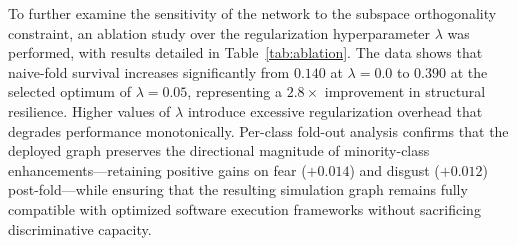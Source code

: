 \documentclass[algorithms,article,submit,moreauthors]{Definitions/mdpi}
\newcommand{\rev}[1]{\textcolor{revcolor}{#1}}
\begin{document}
\begin{table}[h!]
\centering
\caption{Recognition accuracy and macro-$F_1$ across graph variants on RAF-DB and FER2013 datasets.}
\label{tab:accuracy}
\end{table}



To further examine the sensitivity of the network to the subspace orthogonality constraint, an ablation study over the regularization hyperparameter $\lambda$ was performed, with results detailed in Table~\ref{tab:ablation}. The data shows that naive-fold survival increases significantly from $0.140$ at $\lambda = 0.0$ to $0.390$ at the selected optimum of $\lambda = 0.05$, representing a $2.8\times$ improvement in structural resilience. Higher values of $\lambda$ introduce excessive regularization overhead that degrades performance monotonically. Per-class fold-out analysis confirms that the deployed graph preserves the directional magnitude of minority-class enhancements—retaining positive gains on fear ($+0.014$) and disgust ($+0.012$) post-fold—while ensuring that the resulting simulation graph remains fully compatible with optimized software execution frameworks without sacrificing discriminative capacity.
\end{document}
